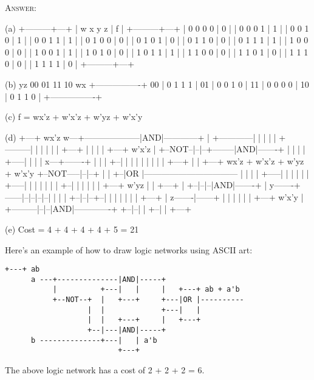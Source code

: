\textsc{Answer:}
\begin{answercode}

(a)      +---------+---+
         | w x y z | f | 
         +---------+---+
         | 0 0 0 0 | 0 |
         | 0 0 0 1 | 1 |
         | 0 0 1 0 | 1 |
         | 0 0 1 1 | 1 |
         | 0 1 0 0 | 0 |
         | 0 1 0 1 | 0 |
         | 0 1 1 0 | 0 |
         | 0 1 1 1 | 1 |
         | 1 0 0 0 | 0 |
         | 1 0 0 1 | 1 |
         | 1 0 1 0 | 0 |
         | 1 0 1 1 | 1 |
         | 1 1 0 0 | 0 |
         | 1 1 0 1 | 0 |
         | 1 1 1 0 | 0 |
         | 1 1 1 1 | 0 |
         +---------+---+
         
(b)   yz   00  01  11  10
   wx    +----------------+
      00 |  0   1   1   1 |
      01 |  0   0   1   0 |
      11 |  0   0   0   0 |
      10 |  0   1   1   0 |
         +----------------+

(c) f = wx'z + w'x'z + w'yz + w'x'y

(d) 
                             +---+ wx'z
    w---+--------------------|AND|------------+                 
        |       +------------|   |            |           
        |       |  +---------|   |            |     
        |       |  |         +---+            |     
        |       |  |           +---+ w'x'z    |     
        +--NOT--|--|--+--------|AND|-------+  |           
                |  |  |  +-----|   |       |  |           
    x---+-------+  |  |  |  +--|   |       |  |           
        |          |  |  |  |  +---+       |  |  +---+ wx'z + w'x'z + w'yz + w'x'y
        +--NOT-----|--|--+  |              |  +--|OR |---------------------------------
                   |  |  |  |              +-----|   |     
                   |  |  |  |              +-----|   |     
                   |  |  |  |              |  +--|   |     
                   |  |  |  |  +---+ w'yz  |  |  +---+           
                   |  +--|--|--|AND|-------+  |             
    y-------+------|--|--|--|--|   |          |         
            |      +--|--|--+--|   |          |         
            |      |  |  |     +---+          |             
    z-------|------+  |  |                    |         
            |         |  |  +---+ w'x'y       |         
            +---------|--|--|AND|-------------+       
                      +--|--|   |                           
                         +--|   |                           
                            +---+                       




(e) Cost = 4 + 4 + 4 + 4 + 5 = 21
\end{answercode}
Here's an example of how to draw logic networks using ASCII art:
\begin{Verbatim}[frame=single]
                          +---+ ab
      a ---+--------------|AND|-----+
           |          +---|   |     |   +---+ ab + a'b
           +--NOT--+  |   +---+     +---|OR |----------
                   |  |             +---|   |
                   |  |   +---+     |   +---+
                   +--|---|AND|-----+
      b --------------+---|   | a'b
                          +---+
\end{Verbatim}
The above logic network has a cost of 2 + 2 + 2 = 6.

\newpage

